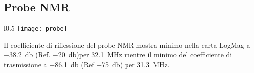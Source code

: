\documentclass[main.tex]{subfiles}
\begin{document}
\subsection{Probe NMR}
\begin{wrapfigure}[10]{l}{0.5\textwidth} \texttt{[image: probe]} \end{wrapfigure}

Il coefficiente di riflessione del probe NMR mostra minimo  nella carta LogMag a \SI{-38.2}{\decibel} (Ref. \SI{-20}{\decibel})per \SI{32.1}{\mega\hertz} mentre il minimo del coefficiente di trasmissione a \SI{-86.1}{\decibel} (Ref \SI{-75}{\decibel}) per \SI{31.3}{\mega\hertz}.




\end{document}
